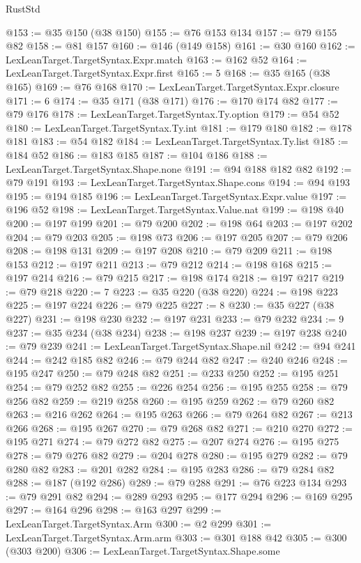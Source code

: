 \begin{lexlean}{RustStd}
\begin{coremodule}
{\begin{coremodule}
{{{{{{{{{{{{{{{{{{{{{{{{{{{{{{{@153 := @35 @150 (@38 @150)
@155 := @76 @153 @134
@157 := @79 @155 @82
@158 := @81 @157
@160 := @146 (@149 @158)
@161 := @30 @160
@162 := LexLeanTarget.TargetSyntax.Expr.match
@163 := @162 @52
@164 := LexLeanTarget.TargetSyntax.Expr.first
@165 := 5
@168 := @35 @165 (@38 @165)
@169 := @76 @168
@170 := LexLeanTarget.TargetSyntax.Expr.closure
@171 := 6
@174 := @35 @171 (@38 @171)
@176 := @170 @174 @82
@177 := @79 @176
@178 := LexLeanTarget.TargetSyntax.Ty.option
@179 := @54 @52
@180 := LexLeanTarget.TargetSyntax.Ty.int
@181 := @179 @180
@182 := @178 @181
@183 := @54 @182
@184 := LexLeanTarget.TargetSyntax.Ty.list
@185 := @184 @52
@186 := @183 @185
@187 := @104 @186
@188 := LexLeanTarget.TargetSyntax.Shape.none
@191 := @94 @188 @182 @82
@192 := @79 @191
@193 := LexLeanTarget.TargetSyntax.Shape.cons
@194 := @94 @193
@195 := @194 @185
@196 := LexLeanTarget.TargetSyntax.Expr.value
@197 := @196 @52
@198 := LexLeanTarget.TargetSyntax.Value.nat
@199 := @198 @40
@200 := @197 @199
@201 := @79 @200
@202 := @198 @64
@203 := @197 @202
@204 := @79 @203
@205 := @198 @73
@206 := @197 @205
@207 := @79 @206
@208 := @198 @131
@209 := @197 @208
@210 := @79 @209
@211 := @198 @153
@212 := @197 @211
@213 := @79 @212
@214 := @198 @168
@215 := @197 @214
@216 := @79 @215
@217 := @198 @174
@218 := @197 @217
@219 := @79 @218
@220 := 7
@223 := @35 @220 (@38 @220)
@224 := @198 @223
@225 := @197 @224
@226 := @79 @225
@227 := 8
@230 := @35 @227 (@38 @227)
@231 := @198 @230
@232 := @197 @231
@233 := @79 @232
@234 := 9
@237 := @35 @234 (@38 @234)
@238 := @198 @237
@239 := @197 @238
@240 := @79 @239
@241 := LexLeanTarget.TargetSyntax.Shape.nil
@242 := @94 @241
@244 := @242 @185 @82
@246 := @79 @244 @82
@247 := @240 @246
@248 := @195 @247
@250 := @79 @248 @82
@251 := @233 @250
@252 := @195 @251
@254 := @79 @252 @82
@255 := @226 @254
@256 := @195 @255
@258 := @79 @256 @82
@259 := @219 @258
@260 := @195 @259
@262 := @79 @260 @82
@263 := @216 @262
@264 := @195 @263
@266 := @79 @264 @82
@267 := @213 @266
@268 := @195 @267
@270 := @79 @268 @82
@271 := @210 @270
@272 := @195 @271
@274 := @79 @272 @82
@275 := @207 @274
@276 := @195 @275
@278 := @79 @276 @82
@279 := @204 @278
@280 := @195 @279
@282 := @79 @280 @82
@283 := @201 @282
@284 := @195 @283
@286 := @79 @284 @82
@288 := @187 (@192 @286)
@289 := @79 @288
@291 := @76 @223 @134
@293 := @79 @291 @82
@294 := @289 @293
@295 := @177 @294
@296 := @169 @295
@297 := @164 @296
@298 := @163 @297
@299 := LexLeanTarget.TargetSyntax.Arm
@300 := @2 @299
@301 := LexLeanTarget.TargetSyntax.Arm.arm
@303 := @301 @188 @42
@305 := @300 (@303 @200)
@306 := LexLeanTarget.TargetSyntax.Shape.some
}}}}}}}}}}}}}}}}}}}}}}}}}}}}}}}
\end{coremodule}}
\end{coremodule}
\end{lexlean}
